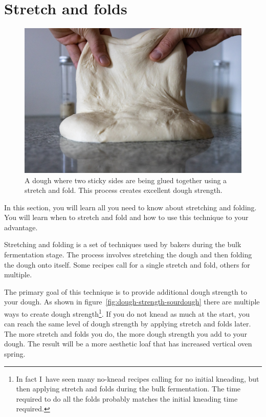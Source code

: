 \section{Stretch and folds}

\begin{figure}[!htb]
  \includegraphics[width=\textwidth]{dough-being-glued}
  \caption[Gluing dough]{A dough where two sticky sides are being glued
      together using a stretch and fold. This process creates excellent dough
      strength.}
\end{figure}

In this section, you will learn all you need to know about stretching and
folding. You will learn when to stretch and fold and how to use this technique
to your advantage.

Stretching and folding is a set of techniques used by bakers during the bulk
fermentation stage. The process involves stretching the dough and then
folding the dough onto itself. Some recipes call for a single stretch
and fold, others for multiple.

The primary goal of this technique is to provide
additional dough strength to your dough. As shown in figure~\ref{fig:dough-strength-sourdough}
there are multiple ways to create dough strength\footnote{In fact I~have seen many no-knead
recipes calling for no initial kneading, but then applying stretch and folds
during the bulk fermentation. The time required to do all the folds probably
matches the initial kneading time required.}. If you do not knead as much at
the start, you can reach the same level of dough strength by applying stretch
and folds later. The more stretch and folds you do, the more dough strength
you add to your dough. The result will be a more aesthetic loaf that has
increased vertical oven spring.


